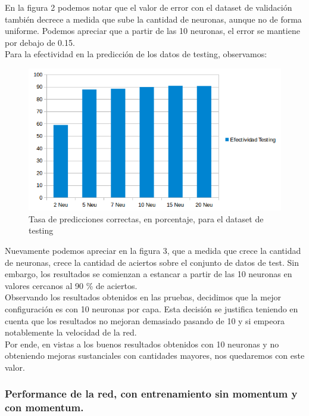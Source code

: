 En la figura 2 podemos notar que el valor de error con el dataset de validación también decrece a medida que sube la cantidad
de neuronas, aunque no de forma uniforme. Podemos apreciar que a partir de las 10 neuronas, el error se mantiene por debajo de 0.15.\\

Para la efectividad en la predicción de los datos de testing, observamos:

\begin{figure}[h]
  \begin{center}
  \includegraphics[scale=0.8]{graficos/fig3_cant_neuro_testing.png}
  \caption{Tasa de predicciones correctas, en porcentaje, para el dataset de testing}
  \end{center}
\end{figure}

Nuevamente podemos apreciar en la figura 3, que a medida que crece la cantidad de neuronas, crece la cantidad de aciertos sobre el conjunto de datos de test. Sin embargo, los resultados se comienzan a estancar a partir de las 10 neuronas en valores cercanos al 90 \% de aciertos.\\

Observando los resultados obtenidos en las pruebas, decidimos que la mejor configuración es con 10 neuronas por capa. Esta decisión se justifica teniendo en cuenta que los resultados no mejoran demasiado pasando de 10 y si empeora notablemente la velocidad de la red.\\
Por ende, en vistas a los buenos resultados obtenidos con 10 neuronas y no obteniendo mejoras sustanciales con cantidades mayores, nos quedaremos con este valor.

\subsubsection{Performance de la red, con entrenamiento sin momentum y con momentum.}

